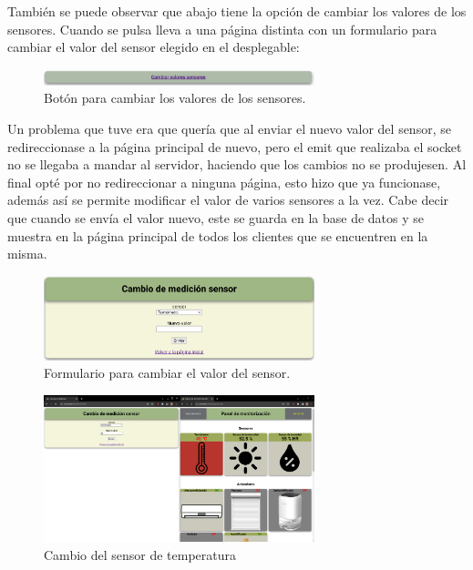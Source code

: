 \documentclass{article}
\begin{document}
También se puede observar que abajo tiene la opción de cambiar los valores de los sensores. Cuando se pulsa lleva a una página distinta con un formulario para cambiar el valor del sensor elegido en el desplegable:

\begin{figure}[H]
    \centering
    \includegraphics[width=0.7\textwidth]{images/cambiarsensor.png}
    \caption{Botón para cambiar los valores de los sensores.}
\end{figure}

Un problema que tuve era que quería que al enviar el nuevo valor del sensor, se redireccionase a la página principal de nuevo, pero el emit que realizaba el socket no se llegaba a mandar al servidor, haciendo que los cambios no se produjesen. Al final opté por no redireccionar a ninguna página, esto hizo que ya funcionase, además así se permite modificar el valor de varios sensores a la vez. Cabe decir que cuando se envía el valor nuevo, este se guarda en la base de datos y se muestra en la página principal de todos los clientes que se encuentren en la misma.

\begin{figure}[H]
    \centering
    \includegraphics[width=0.7\textwidth]{images/form.png}
    \caption{Formulario para cambiar el valor del sensor.}
\end{figure}

\begin{figure}[H]
    \centering
    \includegraphics[width=0.7\textwidth]{images/cambiotemp.png}
    \caption{Cambio del sensor de temperatura}
\end{figure}
\end{document}

